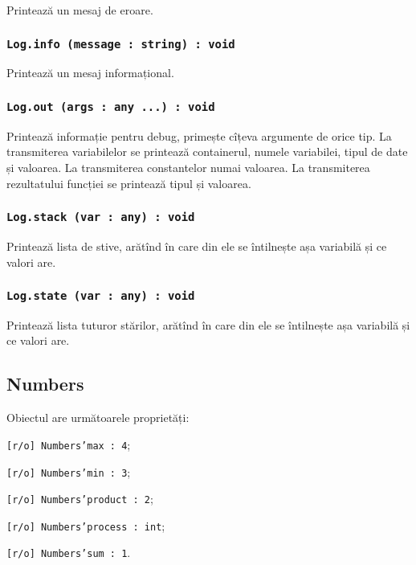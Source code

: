 Printează un mesaj de eroare.

\subsubsection{\texttt{Log.info (message : string) : void}}

Printează un mesaj informațional.

\subsubsection{\texttt{Log.out (args : any ...) : void}}

Printează informație pentru debug, primește cîțeva argumente de orice tip. La transmiterea variabilelor se printează containerul, numele variabilei, tipul de date și valoarea. La transmiterea constantelor numai valoarea. La transmiterea rezultatului funcției se printează tipul și valoarea.

\subsubsection{\texttt{Log.stack (var : any) : void}}

Printează lista de stive, arătînd în care din ele se întilnește așa variabilă și ce valori are.

\subsubsection{\texttt{Log.state (var : any) : void}}

Printează lista tuturor stărilor, arătînd în care din ele se întilnește așa variabilă și ce valori are.

\subsection{Numbers}

Obiectul \numbers{} are următoarele proprietăți:
\begin{icItems}
	\item \texttt{[r/o] Numbers'max : 4};
	\item \texttt{[r/o] Numbers'min : 3};
	\item \texttt{[r/o] Numbers'product : 2};
	\item \texttt{[r/o] Numbers'process : int};
	\item \texttt{[r/o] Numbers'sum : 1}.
\end{icItems}

